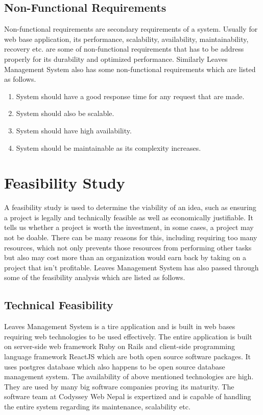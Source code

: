  \subsection{Non-Functional Requirements}
  Non-functional requirements are secondary requirements of a system. Usually for web base
application, its performance, scalability, availability, maintainability, recovery etc. are some
of non-functional requirements that has to be address properly for its durability and optimized
performance. Similarly Leaves Management System also has some non-functional
requirements which are listed as follows.
\newline

\begin{enumerate}
\item{System should have a good response time for any request that are made.}
\item{System should also be scalable.}
\item{System should have high availability.}
\item{System should be maintainable as its complexity increases.}
\end{enumerate}
  


\section{Feasibility Study}
A feasibility study is used to determine the viability of an idea, such as ensuring a project is
legally and technically feasible as well as economically justifiable. It tells us whether a
project is worth the investment, in some cases, a project may not be doable. There can be
many reasons for this, including requiring too many resources, which not only prevents those
resources from performing other tasks but also may cost more than an organization would
earn back by taking on a project that isn’t profitable. Leaves Management System has also
passed through some of the feasibility analysis which are listed as follows.

\subsection{Technical Feasibility}
Leaves Management System is a tire application and is built in web bases requiring web
technologies to be used effectively. The entire application is built on server-side web
framework Ruby on Rails and client-side programming language framework ReactJS which
are both open source software packages. It uses postgres database which also happens to be
open source database management system. The availability of above mentioned technologies
are high. They are used by many big software companies proving its maturity. The software
team at Codyssey Web Nepal is expertized and is capable of handling the entire system
regarding its maintenance, scalability etc.

